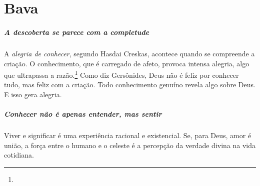 
\chapter*{Bava \smallskip{}}

\begin{center}
{\huge{}}
\end{center}

\paragraph{A descoberta se parece com a completude} A \textit{alegria de conhecer}, segundo Hasdai Creskas, acontece quando se compreende a criação. O conhecimento, que é carregado de afeto, provoca intensa alegria, algo que ultrapassa a razão.\footnote{} Como diz Gersônides, Deus não é feliz por conhecer tudo, mas feliz com a criação. Todo conhecimento genuíno revela algo sobre Deus. E isso gera alegria.

\paragraph{Conhecer não é apenas entender, mas sentir} Viver e significar é uma experiência racional e existencial. Se, para Deus, amor é união, a força entre o humano e o celeste é a percepção da verdade divina na vida cotidiana.

